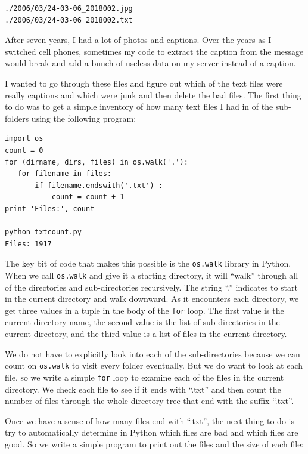 \documentclass[11pt]{book}
\begin{document}
\beforeverb
\begin{verbatim}
./2006/03/24-03-06_2018002.jpg
./2006/03/24-03-06_2018002.txt
\end{verbatim}
\afterverb
%
After seven years, I had a lot of photos and captions.  Over the years
as I switched cell phones, sometimes my code to extract the caption from the message 
would break and add a bunch of useless data on my server instead of a caption.  

I wanted to go through these files and figure out which of the 
text files were really captions and which were junk and then delete the bad
files.  The first thing to do was to get a simple inventory of 
how many text files I had in of the sub-folders
using the following program:

\beforeverb
\begin{verbatim}
import os
count = 0
for (dirname, dirs, files) in os.walk('.'):
   for filename in files:
       if filename.endswith('.txt') :
           count = count + 1
print 'Files:', count

python txtcount.py
Files: 1917
\end{verbatim}
\afterverb
%
The key bit of code that makes this possible is the {\tt os.walk}
library in Python.  When we call {\tt os.walk} and give it a starting
directory, it will ``walk'' through all of the directories 
and sub-directories recursively.   The string ``.'' indicates
to start in the current directory and walk downward.
As it encounters each directory,
we get three values in a tuple in the body of the {\tt for} loop.  
The first value is the current
directory name, the second value is the list of sub-directories 
in the current directory, and the third value is a list of files
in the current directory.

We do not have to explicitly look into each of the sub-directories
because we can count on {\tt os.walk} to visit every 
folder eventually.  But we do want to look at each file, so 
we write a simple {\tt for} loop to examine each of the files 
in the current directory.   We check each file to see if 
it ends with ``.txt'' and then count the number of 
files through the whole directory tree that end with the
suffix ``.txt''.

Once we have a sense of how many files end with ``.txt'', the next
thing to do is try to automatically
determine in Python which files are bad and which files
are good.   So we write a simple program to print out the
files and the size of each file:
\end{document}
